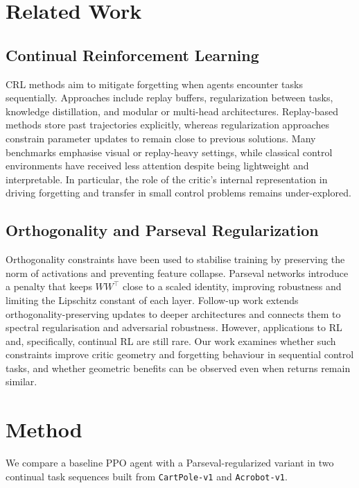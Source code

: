 \documentclass[conference]{IEEEtran}
\begin{document}
\section{Related Work}

\subsection{Continual Reinforcement Learning}

CRL methods aim to mitigate forgetting when agents encounter tasks sequentially. Approaches include replay buffers, regularization between tasks, knowledge distillation, and modular or multi-head architectures. Replay-based methods store past trajectories explicitly, whereas regularization approaches constrain parameter updates to remain close to previous solutions. Many benchmarks emphasise visual or replay-heavy settings, while classical control environments have received less attention despite being lightweight and interpretable. In particular, the role of the critic’s internal representation in driving forgetting and transfer in small control problems remains under-explored.

\subsection{Orthogonality and Parseval Regularization}

Orthogonality constraints have been used to stabilise training by preserving the norm of activations and preventing feature collapse. Parseval networks introduce a penalty that keeps $WW^\top$ close to a scaled identity, improving robustness and limiting the Lipschitz constant of each layer. Follow-up work extends orthogonality-preserving updates to deeper architectures and connects them to spectral regularisation and adversarial robustness. However, applications to RL and, specifically, continual RL are still rare. Our work examines whether such constraints improve critic geometry and forgetting behaviour in sequential control tasks, and whether geometric benefits can be observed even when returns remain similar.

\section{Method}

We compare a baseline PPO agent with a Parseval-regularized variant in two continual task sequences built from \texttt{CartPole-v1} and \texttt{Acrobot-v1}.
\end{document}
